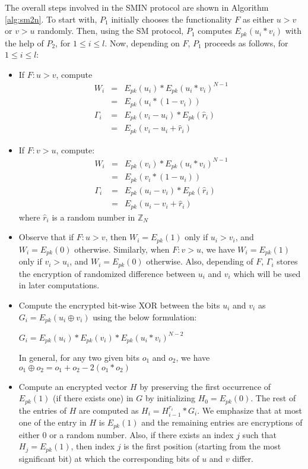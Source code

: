 \documentclass{article}
\begin{document}
The overall steps involved in the SMIN protocol are shown in 
Algorithm \ref{alg:sm2n}. To start with, $P_1$ initially 
chooses the functionality $F$ as either $u > v$ or $v > u$ 
randomly. Then, using the SM protocol, $P_1$ computes $E_{pk}(u_i\ast v_i)$ 
with the help of $P_2$, for $1 \le i \le l$. Now, depending on $F$, 
$P_1$ proceeds as follows, for $1 \leq i \leq l$:
\begin{itemize}
\item If $F: u > v$, compute
\begin{eqnarray*}
W_i &= &E_{pk}(u_i)\ast E_{pk}(u_i\ast v_i)^{N-1}\\
 & =& E_{pk}(u_i *(1 -  v_i)) \\
\Gamma_i &= & E_{pk}(v_i - u_i)\ast E_{pk}(\hat{r}_i)\\ 
 &=&  E_{pk}(v_i - u_i + \hat{r}_i)
\end{eqnarray*}
\item If $F: v > u$, compute:
\begin{eqnarray*}
W_i &= &E_{pk}(v_i)\ast E_{pk}(u_i\ast v_i)^{N-1}\\
 & =& E_{pk}(v_i \ast(1- u_i)) \\
\Gamma_i &= & E_{pk}(u_i - v_i)\ast E_{pk}(\hat{r}_i)\\ 
 &=&  E_{pk}(u_i - v_i + \hat{r}_i)
\end{eqnarray*}
where $\hat{r}_i$ is a random number in $\mathbb{Z}_N$
\item Observe that if $F: u >v$, then $W_i = E_{pk}(1)$ only if $u_i > v_i$, 
and $W_i = E_{pk}(0)$ otherwise. Similarly, when $F: v > u$, we have $W_i = E_{pk}(1)$ only 
if $v_i > u_i$, and $W_i = E_{pk}(0)$ otherwise. Also, depending of $F$, $\Gamma_i$ stores the encryption of 
randomized difference between $u_i$ and $v_i$ which will be used in later computations. 
\item Compute the encrypted bit-wise XOR 
between the bits $u_i$ and $v_i$ as $G_i = E_{pk}(u_i \oplus v_i)$  using the 
below formulation:
\begin{center}$G_i = E_{pk}(u_i)\ast E_{pk}(v_i)\ast E_{pk}(u_i\ast v_i)^{N-2}$
\end{center} In general, for any two given bits $o_1$ and $o_2$, we have $o_1\oplus o_2 = o_1 + o_2 -2(o_1\ast o_2)$

\item Compute an encrypted vector $H$ by preserving the first occurrence of $E_{pk}(1)$ (if there 
exists one) in $G$ by initializing $H_0 = E_{pk}(0)$. The  
rest of the entries of $H$ are computed as $H_i =  H_{i-1}^{r_i}\ast G_i$. 
We emphasize that at most one of the entry in $H$ is $E_{pk}(1)$ and the remaining 
entries are encryptions of either 0 or a random number. Also, if there exists an index 
$j$ such that $H_j = E_{pk}(1)$, then index $j$ is the first position (starting from the most significant bit) 
at which the corresponding bits of 
$u$ and $v$ differ.


\end{itemize}
\end{document}
